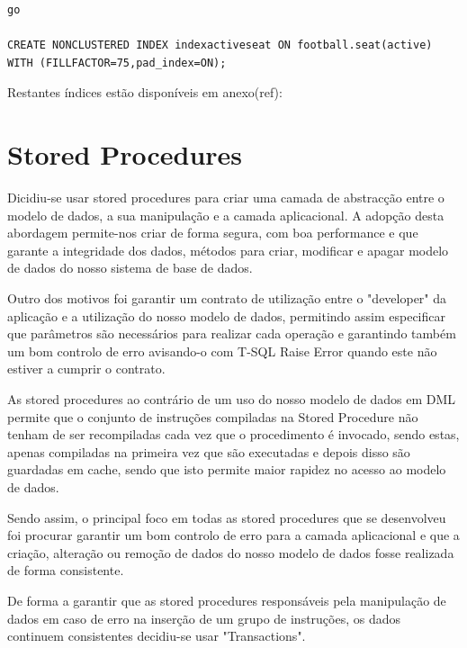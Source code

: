 \documentclass[pdftex,12pt,a4paper]{report}
\begin{document}
\begin{lstlisting}
go

CREATE NONCLUSTERED INDEX indexactiveseat ON football.seat(active)
WITH (FILLFACTOR=75,pad_index=ON);
\end{lstlisting}
 \vspace{0,5in}
Restantes índices estão disponíveis em anexo(ref):
\\


\newpage

\section{Stored Procedures}
Dicidiu-se usar stored procedures para criar uma camada de abstracção entre o modelo de dados, a sua manipulação e a camada aplicacional. A adopção desta abordagem permite-nos criar de forma segura, com boa performance e que garante a integridade dos dados, métodos para criar, modificar e apagar modelo de dados do nosso sistema de base de dados.

Outro dos motivos foi garantir um contrato de utilização entre o "developer" da aplicação e a utilização do nosso modelo de dados, permitindo assim especificar que parâmetros são necessários para realizar cada operação e garantindo também um bom controlo de erro avisando-o com T-SQL Raise Error quando este não estiver a cumprir o contrato.

As stored procedures ao contrário de um uso do nosso modelo de dados em DML permite que o conjunto de instruções compiladas na Stored Procedure  não tenham de ser recompiladas cada vez que o procedimento é invocado, sendo estas, apenas compiladas na primeira vez que são executadas e depois disso são guardadas em cache, sendo que isto permite maior rapidez no acesso ao modelo de dados.

Sendo assim, o principal foco em todas as stored procedures que se desenvolveu foi procurar garantir um bom controlo de erro para a camada aplicacional e que a criação, alteração ou remoção de dados do nosso modelo de dados fosse realizada de forma consistente.

De forma a garantir que as stored procedures responsáveis pela manipulação de dados em caso de erro na inserção de um grupo de instruções, os dados continuem consistentes  decidiu-se usar "Transactions".
\end{document}
